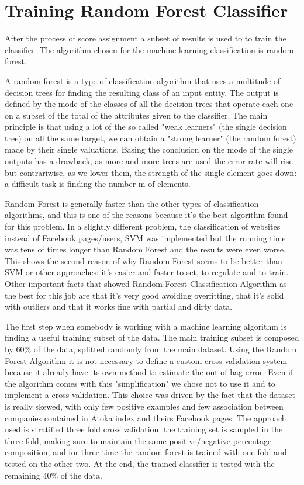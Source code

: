 \section{Training Random Forest Classifier}

After the process of score assignment a subset of results is used to to train the classifier. The algorithm chosen for the machine learning classification is random forest.


A random forest is a type of classification algorithm that uses a multitude of decision trees for finding the resulting class of an input entity. The output is defined by the mode of the classes of all the decision trees that operate each one on a subset of the total of the attributes given to the classifier. The main principle is that using a lot of the so called "weak learners" (the single decision tree) on all the same target, we can obtain a "strong learner" (the random forest) made by their single valuations. Basing the conclusion on the mode of the single outputs has a drawback, as more and more trees are used the error rate will rise but contrariwise, as we lower them, the strength of the single element goes down: a difficult task is finding the number m of elements.

Random Forest is generally faster than the other types of classification algorithms, and this is one of the reasons because it's the best algorithm found for this problem\cite{randomforestart}. In a slightly different problem, the classification of websites instead of Facebook pages/users, SVM was implemented but the running time was tens of times longer than Random Forest and the results were even worse. This shows the second reason of why Random Forest seems to be better than SVM or other approaches: it's easier and faster to set, to regulate and to train.
Other important facts that showed Random Forest Classification Algorithm as the best for this job are that it's very good avoiding overfitting, that it's solid with outliers and that it works fine with partial and dirty data.

The first step when somebody is working with a machine learning algorithm is finding a useful training subset of the data. The main training subset is composed by 60\% of the data, splitted randomly from the main dataset.
Using the Random Forest Algorithm it is not necessary to define a custom cross validation system because it already have its own method to estimate the out-of-bag error. Even if the algorithm comes with this "simplification" we chose not to use it and to implement a cross validation. This choice was driven by the fact that the dataset is really skewed, with only few positive examples and few association between companies contained in Atoka index and theirs Facebook pages. The approach used is stratified three fold cross validation: the training set is sampled in the three fold, making sure to maintain the same positive/negative percentage composition, and for three time the random forest is trained with one fold and tested on the other two.
At the end, the trained classifier is tested with the remaining 40\% of the data.


